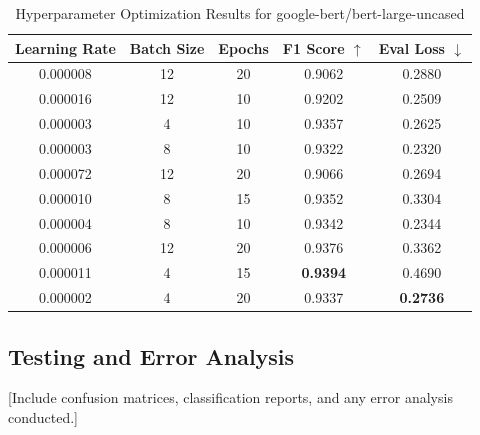 \documentclass[a4paper,11pt]{article}
\begin{document}
\begin{table}[H]
	\centering
	\caption{Hyperparameter Optimization Results for google-bert/bert-large-uncased}
	\begin{tabular}{|c|c|c|c|c|}
		\hline
		\textbf{Learning Rate} & \textbf{Batch Size} & \textbf{Epochs} & \textbf{F1 Score $\uparrow$} & \textbf{Eval Loss $\downarrow$} \\ \hline
		0.000008               & 12                  & 20              & 0.9062                       & 0.2880                          \\ \hline
		0.000016               & 12                  & 10              & 0.9202                       & 0.2509                          \\ \hline
		0.000003               & 4                   & 10              & 0.9357                       & 0.2625                          \\ \hline
		0.000003               & 8                   & 10              & 0.9322                       & 0.2320                          \\ \hline
		0.000072               & 12                  & 20              & 0.9066                       & 0.2694                          \\ \hline
		0.000010               & 8                   & 15              & 0.9352                       & 0.3304                          \\ \hline
		0.000004               & 8                   & 10              & 0.9342                       & 0.2344                          \\ \hline
		0.000006               & 12                  & 20              & 0.9376                       & 0.3362                          \\ \hline
		0.000011               & 4                   & 15              & \textbf{0.9394}              & 0.4690                          \\ \hline
		0.000002               & 4                   & 20              & 0.9337                       & \textbf{0.2736}                 \\ \hline
	\end{tabular}\label{tab:hyperparam_results_all}
\end{table}

\subsection{Testing and Error Analysis}
[Include confusion matrices, classification reports, and any error analysis conducted.]
\end{document}
